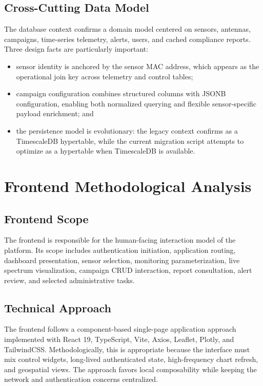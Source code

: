 \documentclass[11pt,a4paper]{article}
\newcommand{\code}[1]{\path{#1}}
\begin{document}
\subsection{Cross-Cutting Data Model}
The database context confirms a domain model centered on sensors, antennas, campaigns, time-series telemetry, alerts, users, and cached compliance reports. Three design facts are particularly important:

\begin{itemize}
  \item sensor identity is anchored by the sensor MAC address, which appears as the operational join key across telemetry and control tables;
  \item campaign configuration combines structured columns with JSONB configuration, enabling both normalized querying and flexible sensor-specific payload enrichment; and
  \item the persistence model is evolutionary: the legacy context confirms \code{sensor_status} as a TimescaleDB hypertable, while the current migration script attempts to optimize \code{sensor_data} as a hypertable when TimescaleDB is available.
\end{itemize}

\section{Frontend Methodological Analysis}

\subsection{Frontend Scope}
The frontend is responsible for the human-facing interaction model of the platform. Its scope includes authentication initiation, application routing, dashboard presentation, sensor selection, monitoring parameterization, live spectrum visualization, campaign CRUD interaction, report consultation, alert review, and selected administrative tasks.

\subsection{Technical Approach}
The frontend follows a component-based single-page application approach implemented with React 19, TypeScript, Vite, Axios, Leaflet, Plotly, and TailwindCSS. Methodologically, this is appropriate because the interface must mix control widgets, long-lived authenticated state, high-frequency chart refresh, and geospatial views. The approach favors local composability while keeping the network and authentication concerns centralized.
\end{document}
